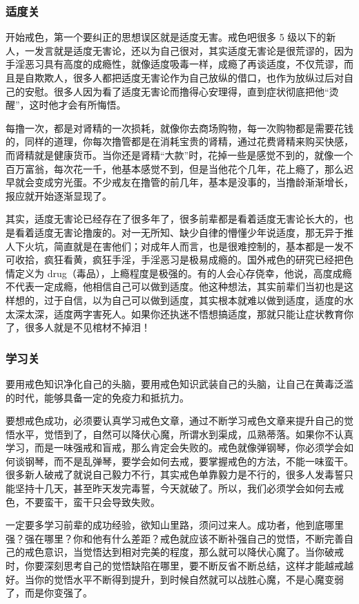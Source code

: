 \documentclass{ctexart}
\begin{document}
\subsubsection{适度关}

开始戒色，第一个要纠正的思想误区就是适度无害。戒色吧很多 5 级以下的新人，一发言就是适度无害论，还以为自己很对，其实适度无害论是很荒谬的，因为手淫恶习具有高度的成瘾性，就像适度吸毒一样，成瘾了再谈适度，不仅荒谬，而且是自欺欺人，很多人都把适度无害论作为自己放纵的借口，也作为放纵过后对自己的安慰。很多人因为看了适度无害论而撸得心安理得，直到症状彻底把他“烫醒”，这时他才会有所悔悟。

每撸一次，都是对肾精的一次损耗，就像你去商场购物，每一次购物都是需要花钱的，同样的道理，你每次撸管都是在消耗宝贵的肾精，通过花费肾精来购买快感，而肾精就是健康货币。当你还是肾精“大款”时，花掉一些是感觉不到的，就像一个百万富翁，每次花一千，他基本感觉不到，但是当他花个几年，花上瘾了，那么迟早就会变成穷光蛋。不少戒友在撸管的前几年，基本是没事的，当撸龄渐渐增长，报应就开始逐渐显现了。

其实，适度无害论已经存在了很多年了，很多前辈都是看着适度无害论长大的，也是看着适度无害论撸废的。对一无所知、缺少自律的懵懂少年说适度，那无异于推人下火坑，简直就是在害他们；对成年人而言，也是很难控制的，基本都是一发不可收拾，疯狂看黄，疯狂手淫，手淫恶习是极易成瘾的。国外戒色的研究已经把色情定义为 drug（毒品），上瘾程度是极强的。有的人会心存侥幸，他说，高度成瘾不代表一定成瘾，他相信自己可以做到适度。他这种想法，其实前辈们当初也是这样想的，过于自信，以为自己可以做到适度，其实根本就难以做到适度，适度的水太深太深，适度两字害死人。如果你还执迷不悟想搞适度，那就只能让症状教育你了，很多人就是不见棺材不掉泪！

\subsubsection{学习关}

要用戒色知识净化自己的头脑，要用戒色知识武装自己的头脑，让自己在黄毒泛滥的时代，能够具备一定的免疫力和抵抗力。

要想戒色成功，必须要认真学习戒色文章，通过不断学习戒色文章来提升自己的觉悟水平，觉悟到了，自然可以降伏心魔，所谓水到渠成，瓜熟蒂落。如果你不认真学习，而是一味强戒和盲戒，那么肯定会失败的。戒色就像弹钢琴，你必须学会如何谈钢琴，而不是乱弹琴，要学会如何去戒，要掌握戒色的方法，不能一味蛮干。很多新人破戒了就说自己毅力不行，其实戒色单靠毅力是不行的，很多人发毒誓只能坚持十几天，甚至昨天发完毒誓，今天就破了。所以，我们必须学会如何去戒色，不要蛮干，蛮干只会导致失败。

一定要多学习前辈的成功经验，欲知山里路，须问过来人。成功者，他到底哪里强？强在哪里？你和他有什么差距？戒色就应该不断补强自己的觉悟，不断完善自己的戒色意识，当觉悟达到相对完美的程度，那么就可以降伏心魔了。当你破戒时，你要深刻思考自己的觉悟缺陷在哪里，要不断反省不断总结，这样才能越戒越好。当你的觉悟水平不断得到提升，到时候自然就可以战胜心魔，不是心魔变弱了，而是你变强了。
\end{document}

